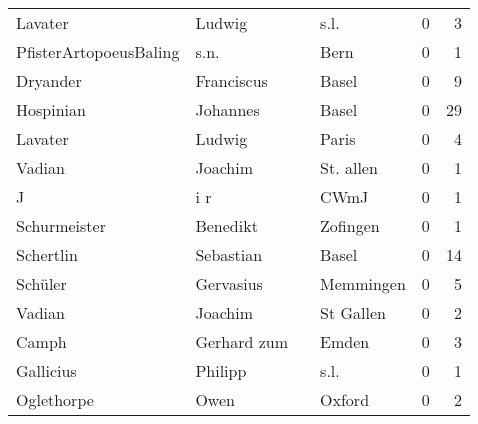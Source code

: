\begin{tabular}{llllrr}
                  Lavater &                             Ludwig &             &                                        s.l. &          0 &         3 \\
   PfisterArtopoeusBaling &                               s.n. &             &                                        Bern &          0 &         1 \\
                 Dryander &                         Franciscus &             &                                       Basel &          0 &         9 \\
                Hospinian &                           Johannes &             &                                       Basel &          0 &        29 \\
                  Lavater &                             Ludwig &             &                                       Paris &          0 &         4 \\
                   Vadian &                            Joachim &             &                                   St. allen &          0 &         1 \\
                        J &                                i r &             &                                        CWmJ &          0 &         1 \\
             Schurmeister &                           Benedikt &             &                                    Zofingen &          0 &         1 \\
                Schertlin &                          Sebastian &             &                                       Basel &          0 &        14 \\
                  Schüler &                          Gervasius &             &                                   Memmingen &          0 &         5 \\
                   Vadian &                            Joachim &             &                                   St Gallen &          0 &         2 \\
                    Camph &                        Gerhard zum &             &                                       Emden &          0 &         3 \\
                Gallicius &                            Philipp &             &                                        s.l. &          0 &         1 \\
               Oglethorpe &                               Owen &             &                                      Oxford &          0 &         2 \\

\end{tabular}
